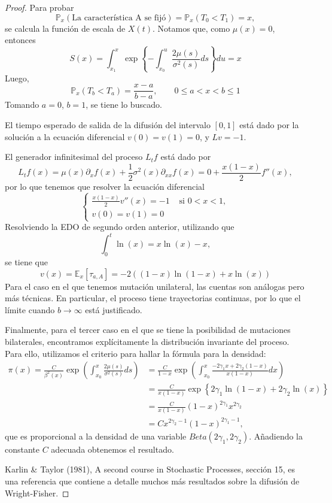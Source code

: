 \documentclass[letterpaper]{article}
\renewcommand{\to}{\rightarrow}
\newcommand{\E}{\mathbb{E}}
\renewcommand{\P}{\mathbb{P}}
\newcommand{\1}{\mathds{1}}
\theoremstyle{definition}
\theoremstyle{definition}
\theoremstyle{definition}
\theoremstyle{definition}
\theoremstyle{definition}
\begin{document}
 \begin{proof} 

    Para probar 
    \[
        \P_x(\text{La característica A se fijó})=\P_x(T_0<T_1)=x,
    \]
    se calcula la función de escala de $X(t)$. Notamos que, como $\mu(x)=0$, entonces 
    \[
    S(x)=\int_{x_1}^{x}\exp \left\{-\int_{x_0}^{u}\frac{2\mu(s)}{\sigma^2(s)}ds \right\} du =x  
    \]
    Luego, 
    \[
    \P_x(T_b<T_a)=\frac{x-a}{b-a}, \qquad 0\leq a<x<b\leq1    
    \]
    Tomando $a=0$, $b=1$, se tiene lo buscado.

    El tiempo esperado de salida de la difusión del intervalo $[0,1]$ está dado por la solución 
    a la ecuación diferencial $v(0)=v(1)=0$, y $Lv=-1$.

    El generador infinitesimal del proceso $L_tf$ está dado por 
    \[
        L_tf(x)=\mu(x)\partial_xf(x) +\frac{1}{2}\sigma^2(x)\partial_{xx}f(x)=0+\frac{x(1-x)}{2}f''(x),
    \]
    por lo que tenemos que resolver la ecuación diferencial 
    \[
    \begin{cases}
        \frac{x(1-x)}{2}v''(x)=-1 & \text{ si } 0<x<1,\\
        v(0)=v(1)=0 
    \end{cases}    
    \]
    Resolviendo la EDO de segundo orden anterior, utilizando que 
    \[
    \int_0^{t}\ln(x)= x\ln(x)-x,     
    \]
    se tiene que 
    \[
    v(x)=\E_x\left[\tau_{a,A}\right]=-2((1-x)\ln(1-x)+x\ln(x))    
    \]
    Para el caso en el que tenemos mutación unilateral, las cuentas son análogas pero más técnicas. En particular, el proceso tiene trayectorias continuas, por lo que el límite
    cuando $b\to \infty$ está justificado.
    \newline

    Finalmente, para el tercer caso en el que se tiene la posibilidad de mutaciones bilaterales, encontramos explícitamente 
    la distribución invariante del proceso.\\
    
    Para ello, utilizamos el criterio para hallar la fórmula para la densidad:
    \begin{align*}
        \pi(x)=\frac{C}{\beta^2(x)}\exp \left(\int_{x_0}^{x}\frac{2\mu(s)}{\sigma^2(s)}ds\right)&=\frac{C}{1-x}\exp \left(\int_{x_0}^{x}\frac{-2\gamma_1x+2\gamma_2(1-x)}{x(1-x)}dx\right)\\
        &=\frac{C}{x(1-x)}\exp \left\{2\gamma_1 \ln(1-x)+2\gamma_2\ln(x)\right\}\\
        &=\frac{C}{x(1-x)}(1-x)^{2\gamma_1}x^{2\gamma_2}\\
        &=Cx^{2\gamma_2-1}(1-x)^{2\gamma_1-1},
    \end{align*}
    que es proporcional a la densidad de una variable $Beta(2\gamma_1,2\gamma_2)$. Añadiendo la constante 
    $C$ adecuada obtenemos el resultado.
    \newline

    Karlin \& Taylor (1981), A second course in Stochastic Processes, sección 15, es una referencia que contiene 
    a detalle muchos más resultados sobre la difusión de Wright-Fisher.
    
\end{proof}
\end{document}
